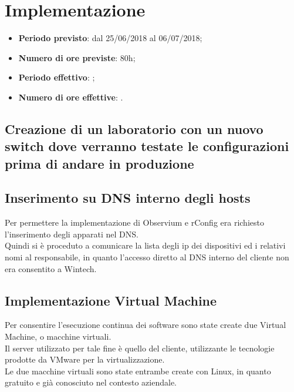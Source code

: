 \documentclass[Realizzazione.tex]{subfiles}
\begin{document}
\section{Implementazione}

\begin{itemize}
	\item \textbf{Periodo previsto}: dal 25/06/2018 al 06/07/2018;
	\item \textbf{Numero di ore previste}: 80h;
	\item \textbf{Periodo effettivo}: ;
	\item \textbf{Numero di ore effettive}: .
\end{itemize}

\subsection{Creazione di un laboratorio con un nuovo switch dove verranno testate le configurazioni prima di andare in produzione}

\subsection{Inserimento su DNS interno degli hosts} 
Per permettere la implementazione di Observium e rConfig era richiesto l'inserimento degli apparati nel DNS. \\
Quindi si è proceduto a comunicare la lista degli ip dei dispositivi ed i relativi nomi al responsabile, in quanto l'accesso diretto al DNS interno del cliente non era consentito a Wintech.

\subsection{Implementazione Virtual Machine}
Per consentire l'esecuzione continua dei software sono state create due Virtual Machine, o macchine virtuali.\\
Il server utilizzato per tale fine è quello del cliente, utilizzante le tecnologie prodotte da VMware per la virtualizzazione. \\
Le due macchine virtuali sono state entrambe create con Linux, in quanto gratuito e già conosciuto nel contesto aziendale.
\end{document}
